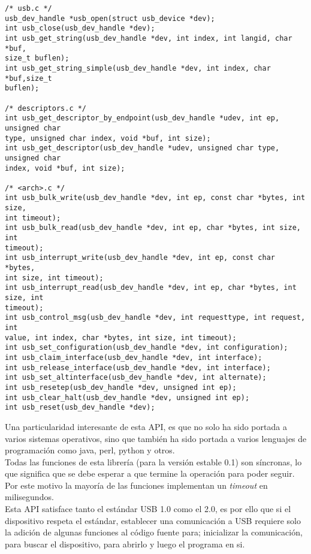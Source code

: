 \begin{lstlisting}
/* usb.c */
usb_dev_handle *usb_open(struct usb_device *dev);
int usb_close(usb_dev_handle *dev);
int usb_get_string(usb_dev_handle *dev, int index, int langid, char *buf,
size_t buflen);
int usb_get_string_simple(usb_dev_handle *dev, int index, char *buf,size_t
buflen);

/* descriptors.c */
int usb_get_descriptor_by_endpoint(usb_dev_handle *udev, int ep, unsigned char
type, unsigned char index, void *buf, int size);
int usb_get_descriptor(usb_dev_handle *udev, unsigned char type, unsigned char
index, void *buf, int size);

/* <arch>.c */
int usb_bulk_write(usb_dev_handle *dev, int ep, const char *bytes, int size,
int timeout);
int usb_bulk_read(usb_dev_handle *dev, int ep, char *bytes, int size, int
timeout);
int usb_interrupt_write(usb_dev_handle *dev, int ep, const char *bytes,
int size, int timeout);
int usb_interrupt_read(usb_dev_handle *dev, int ep, char *bytes, int size, int
timeout);
int usb_control_msg(usb_dev_handle *dev, int requesttype, int request, int
value, int index, char *bytes, int size, int timeout);
int usb_set_configuration(usb_dev_handle *dev, int configuration);
int usb_claim_interface(usb_dev_handle *dev, int interface);
int usb_release_interface(usb_dev_handle *dev, int interface);
int usb_set_altinterface(usb_dev_handle *dev, int alternate);
int usb_resetep(usb_dev_handle *dev, unsigned int ep);
int usb_clear_halt(usb_dev_handle *dev, unsigned int ep);
int usb_reset(usb_dev_handle *dev);
\end{lstlisting}


Una particularidad interesante de esta API, es que no solo ha sido portada a
varios sistemas operativos, sino que tambi\'en ha sido portada a
varios lenguajes de programaci\'on como java, perl, python y otros.\\

Todas las funciones de esta librer\'ia (para la versi\'on estable 0.1) son
s\'incronas, lo que significa que se debe esperar a que termine la operaci\'on
para poder seguir. Por este motivo la mayor\'ia de las funciones implementan un
\emph{timeout} en milisegundos.\\

Esta API satisface tanto el est\'andar USB 1.0 como el 2.0, es por ello que si
el dispositivo respeta el est\'andar, establecer una comunicaci\'on a USB
requiere solo la adici\'on de algunas funciones al c\'odigo fuente para;
inicializar la comunicaci\'on, para buscar el dispositivo, para abrirlo y
luego el programa en si.

